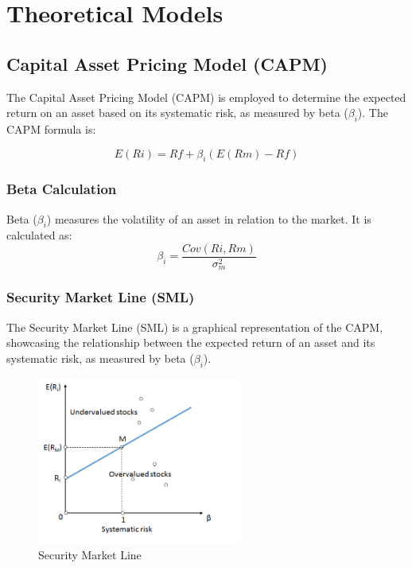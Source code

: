 \section{Theoretical Models}

\subsection{Capital Asset Pricing Model (CAPM)}
The Capital Asset Pricing Model (CAPM) is employed to determine the expected return on an asset based on its systematic risk, as measured by beta ($\beta_i$). The CAPM formula is:

\begin{equation}
E(Ri) = Rf + \beta_i(E(Rm) - Rf)
\end{equation}

\subsubsection{Beta Calculation}
Beta ($\beta_i$) measures the volatility of an asset in relation to the market. It is calculated as:
\begin{equation}
\beta_i = \frac{Cov(Ri, Rm)}{\sigma^2_m}
\end{equation}

\subsubsection{Security Market Line (SML)}
The Security Market Line (SML) is a graphical representation of the CAPM, showcasing the relationship between the expected return of an asset and its systematic risk, as measured by beta ($\beta_i$).

\begin{figure}[h!]
    \centering
    \includegraphics[width=0.6\textwidth]{../Figures/SML.png}
    \caption{Security Market Line}
    \label{fig:SML}
\end{figure}

